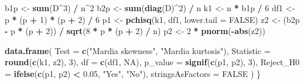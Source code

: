 \documentclass[
  11pt,
]{article}
\newenvironment{Shaded}{\begin{snugshade}}{\end{snugshade}}
\newcommand{\AttributeTok}[1]{\textcolor[rgb]{0.13,0.29,0.53}{#1}}
\newcommand{\ConstantTok}[1]{\textcolor[rgb]{0.56,0.35,0.01}{#1}}
\newcommand{\DecValTok}[1]{\textcolor[rgb]{0.00,0.00,0.81}{#1}}
\newcommand{\FloatTok}[1]{\textcolor[rgb]{0.00,0.00,0.81}{#1}}
\newcommand{\FunctionTok}[1]{\textcolor[rgb]{0.13,0.29,0.53}{\textbf{#1}}}
\newcommand{\NormalTok}[1]{#1}
\newcommand{\OtherTok}[1]{\textcolor[rgb]{0.56,0.35,0.01}{#1}}
\newcommand{\SpecialCharTok}[1]{\textcolor[rgb]{0.81,0.36,0.00}{\textbf{#1}}}
\newcommand{\StringTok}[1]{\textcolor[rgb]{0.31,0.60,0.02}{#1}}
\begin{document}
\begin{Shaded}
\begin{Highlighting}[]
\NormalTok{  b1p }\OtherTok{\textless{}{-}} \FunctionTok{sum}\NormalTok{(D}\SpecialCharTok{\^{}}\DecValTok{3}\NormalTok{) }\SpecialCharTok{/}\NormalTok{ n}\SpecialCharTok{\^{}}\DecValTok{2}
\NormalTok{  b2p }\OtherTok{\textless{}{-}} \FunctionTok{sum}\NormalTok{(}\FunctionTok{diag}\NormalTok{(D)}\SpecialCharTok{\^{}}\DecValTok{2}\NormalTok{) }\SpecialCharTok{/}\NormalTok{ n}
\NormalTok{  k1  }\OtherTok{\textless{}{-}}\NormalTok{ n }\SpecialCharTok{*}\NormalTok{ b1p }\SpecialCharTok{/} \DecValTok{6}
\NormalTok{  df1 }\OtherTok{\textless{}{-}}\NormalTok{ p }\SpecialCharTok{*}\NormalTok{ (p }\SpecialCharTok{+} \DecValTok{1}\NormalTok{) }\SpecialCharTok{*}\NormalTok{ (p }\SpecialCharTok{+} \DecValTok{2}\NormalTok{) }\SpecialCharTok{/} \DecValTok{6}
\NormalTok{  p1  }\OtherTok{\textless{}{-}} \FunctionTok{pchisq}\NormalTok{(k1, df1, }\AttributeTok{lower.tail =} \ConstantTok{FALSE}\NormalTok{)}
\NormalTok{  z2  }\OtherTok{\textless{}{-}}\NormalTok{ (b2p }\SpecialCharTok{{-}}\NormalTok{ p }\SpecialCharTok{*}\NormalTok{ (p }\SpecialCharTok{+} \DecValTok{2}\NormalTok{)) }\SpecialCharTok{/} \FunctionTok{sqrt}\NormalTok{(}\DecValTok{8} \SpecialCharTok{*}\NormalTok{ p }\SpecialCharTok{*}\NormalTok{ (p }\SpecialCharTok{+} \DecValTok{2}\NormalTok{) }\SpecialCharTok{/}\NormalTok{ n)}
\NormalTok{  p2  }\OtherTok{\textless{}{-}} \DecValTok{2} \SpecialCharTok{*} \FunctionTok{pnorm}\NormalTok{(}\SpecialCharTok{{-}}\FunctionTok{abs}\NormalTok{(z2))}

  \FunctionTok{data.frame}\NormalTok{(}
    \AttributeTok{Test       =} \FunctionTok{c}\NormalTok{(}\StringTok{"Mardia skewness"}\NormalTok{, }\StringTok{"Mardia kurtosis"}\NormalTok{),}
    \AttributeTok{Statistic  =} \FunctionTok{round}\NormalTok{(}\FunctionTok{c}\NormalTok{(k1, z2), }\DecValTok{3}\NormalTok{),}
    \AttributeTok{df         =} \FunctionTok{c}\NormalTok{(df1, }\ConstantTok{NA}\NormalTok{),}
    \AttributeTok{p\_value    =} \FunctionTok{signif}\NormalTok{(}\FunctionTok{c}\NormalTok{(p1, p2), }\DecValTok{3}\NormalTok{),}
    \AttributeTok{Reject\_H0  =} \FunctionTok{ifelse}\NormalTok{(}\FunctionTok{c}\NormalTok{(p1, p2) }\SpecialCharTok{\textless{}} \FloatTok{0.05}\NormalTok{, }\StringTok{"Yes"}\NormalTok{, }\StringTok{"No"}\NormalTok{),}
    \AttributeTok{stringsAsFactors =} \ConstantTok{FALSE}
\NormalTok{  )}
\NormalTok{\}}


\end{Highlighting}
\end{Shaded}
\end{document}
